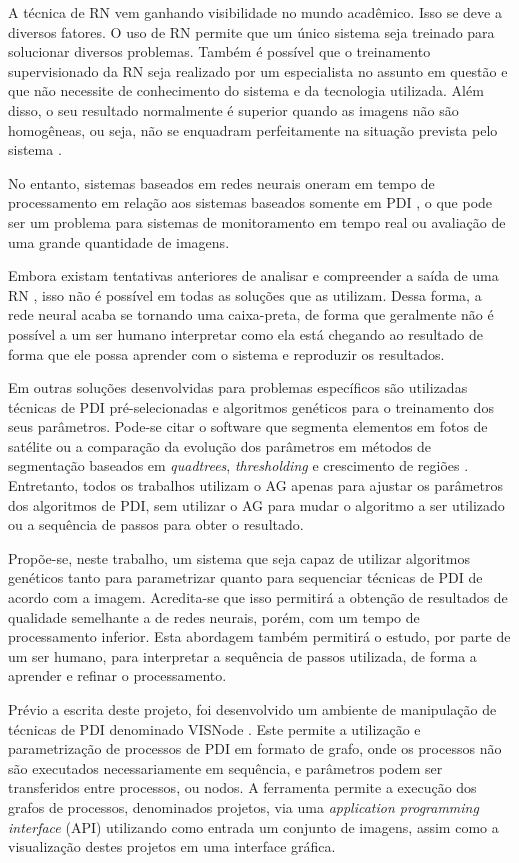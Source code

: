 \documentclass[12pt,oneside,a4paper,english,french,spanish,brazil,]{abntex2}
\begin{document}
A técnica de RN vem ganhando visibilidade no mundo acadêmico. Isso se deve a diversos fatores. O uso de RN permite que um único sistema seja treinado para solucionar diversos problemas. Também é possível que o treinamento supervisionado da RN seja realizado por um especialista no assunto em questão e que não necessite de conhecimento do sistema e da tecnologia utilizada. Além disso, o seu resultado normalmente é superior quando as imagens não são homogêneas, ou seja, não se enquadram perfeitamente na situação prevista pelo sistema \cite{pal:1993}.

No entanto, sistemas baseados em redes neurais oneram em tempo de processamento em relação aos sistemas baseados somente em PDI \cite{huang:1992}, o que pode ser um problema para sistemas de monitoramento em tempo real ou avaliação de uma grande quantidade de imagens.

Embora existam tentativas anteriores de analisar e compreender a saída de uma RN \cite{zeiler:2014}, isso não é possível em todas as soluções que as utilizam. Dessa forma, a rede neural acaba se tornando uma caixa-preta, de forma que geralmente não é possível a um ser humano interpretar como ela está chegando ao resultado de forma que ele possa aprender com o sistema e reproduzir os resultados.

Em outras soluções desenvolvidas para problemas específicos são utilizadas técnicas de PDI pré-selecionadas e algoritmos genéticos \cite{holland:1992} para o treinamento dos seus parâmetros. Pode-se citar o software que segmenta elementos em fotos de satélite \cite{costa:2010} ou a comparação da evolução dos parâmetros em métodos de segmentação baseados em \textit{quadtrees}, \textit{thresholding} e crescimento de regiões \cite{matias:2007}. Entretanto, todos os trabalhos utilizam o AG apenas para ajustar os parâmetros dos algoritmos de PDI, sem utilizar o AG para mudar o algoritmo a ser utilizado ou a sequência de passos para obter o resultado.

Propõe-se, neste trabalho, um sistema que seja capaz de utilizar algoritmos genéticos tanto para parametrizar quanto para sequenciar técnicas de PDI de acordo com a imagem. Acredita-se que isso permitirá a obtenção de resultados de qualidade semelhante a de redes neurais, porém, com um tempo de processamento inferior. Esta abordagem também permitirá o estudo, por parte de um ser humano, para interpretar a sequência de passos utilizada, de forma a aprender e refinar o processamento.

Prévio a escrita deste projeto, foi desenvolvido um ambiente de manipulação de técnicas de PDI denominado VISNode \cite{visnode:2018}. Este permite a utilização e parametrização de processos de PDI em formato de grafo, onde os processos não são executados necessariamente em sequência, e parâmetros podem ser transferidos entre processos, ou nodos. A ferramenta permite a execução dos grafos de processos, denominados projetos, via uma \textit{application programming interface} (API) utilizando como entrada um conjunto de imagens, assim como a visualização destes projetos em uma interface gráfica.
\end{document}
